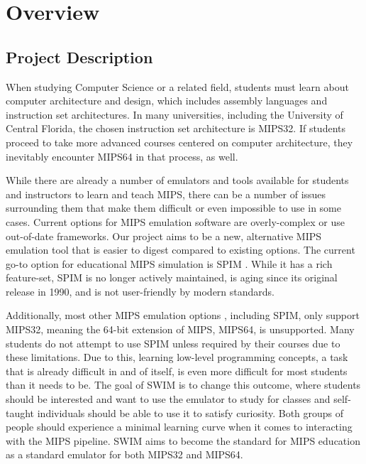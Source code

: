 \documentclass[
    paper=letter,
    parskip=half,
    fontsize=12pt,
    titlepage=firstiscover,
    toc=bibliography,
    numbers=endperiod
]{scrartcl}
\let\oldsection\section
\renewcommand{\section}{\newpage\oldsection}
\begin{document}
\section{Overview}

\subsection{Project Description}
\label{subsec:project-description}

When studying Computer Science or a related field, students must learn
about computer architecture and design, which includes assembly
languages and instruction set architectures. In many universities,
including the University of Central Florida, the chosen instruction set
architecture is MIPS32. If students proceed to take more advanced
courses centered on computer architecture, they inevitably encounter
MIPS64 in that process, as well.

While there are already a number of emulators and tools available for
students and instructors to learn and teach MIPS, there can be a number
of issues surrounding them that make them difficult or even impossible
to use in some cases. Current options for MIPS emulation software are
overly-complex or use out-of-date frameworks. Our project aims to be a
new, alternative MIPS emulation tool that is easier to digest compared
to existing options. The current go-to option for educational MIPS
simulation is SPIM \cite{spim}. While it has a rich feature-set, SPIM is
no longer actively maintained, is aging since its original release in
1990, and is not user-friendly by modern standards.

Additionally, most other MIPS emulation options \cite{wepsim, jsspim,
    wemips, mips-interpreter, mini-mips, mips-assembler-field-guide,
    mips-assembler-hogan, cpulator}, including SPIM, only support MIPS32,
meaning the 64-bit extension of MIPS, MIPS64, is unsupported. Many
students do not attempt to use SPIM unless required by their courses due
to these limitations. Due to this, learning low-level programming
concepts, a task that is already difficult in and of itself, is even
more difficult for most students than it needs to be. The goal of SWIM
is to change this outcome, where students should be interested and want
to use the emulator to study for classes and self-taught individuals
should be able to use it to satisfy curiosity. Both groups of people
should experience a minimal learning curve when it comes to interacting
with the MIPS pipeline. SWIM aims to become the standard for MIPS
education as a standard emulator for both MIPS32 and MIPS64.
\end{document}
